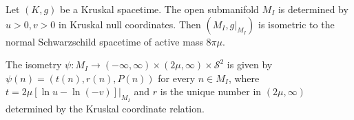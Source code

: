 Let $(K,g)$ be a Kruskal spacetime. The open submanifold $M_I$ is determined by $u > 0, v > 0$ in Kruskal null coordinates. Then $(M_I, g|_{M_I})$ is isometric to the normal Schwarzschild spacetime of active mass $8\pi\mu$.

The isometry $\psi: M_I \rightarrow (-\infty,\infty) \times (2\mu,\infty) \times \mathcal{S}^2$ is given by $\psi(n) = (t(n), r(n), P(n))$ for every $n \in M_I$, where $t = 2\mu[\ln u - \ln(-v)]|_{M_I}$ and $r$ is the unique number in $(2\mu,\infty)$ determined by the Kruskal coordinate relation.
